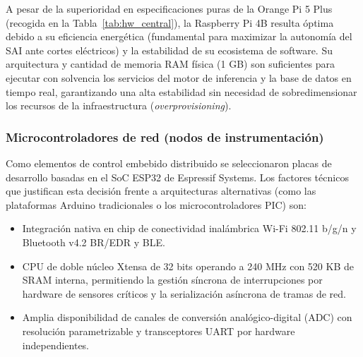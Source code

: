 A pesar de la superioridad en especificaciones puras de la Orange Pi 5 Plus (recogida en la Tabla~\ref{tab:hw_central}), la Raspberry Pi 4B resulta óptima debido a su eficiencia energética (fundamental para maximizar la autonomía del SAI ante cortes eléctricos) y la estabilidad de su ecosistema de software. Su arquitectura y cantidad de memoria RAM física (1 GB) son suficientes para ejecutar con solvencia los servicios del motor de inferencia y la base de datos en tiempo real, garantizando una alta estabilidad sin necesidad de sobredimensionar los recursos de la infraestructura (\textit{overprovisioning}).

\subsubsection{Microcontroladores de red (nodos de instrumentación)}
Como elementos de control embebido distribuido se seleccionaron placas de desarrollo basadas en el SoC ESP32 de Espressif Systems. Los factores técnicos que justifican esta decisión frente a arquitecturas alternativas (como las plataformas Arduino tradicionales o los microcontroladores PIC) son:
\begin{itemize}
    \item Integración nativa en chip de conectividad inalámbrica Wi-Fi 802.11 b/g/n y Bluetooth v4.2 BR/EDR y BLE.
    \item CPU de doble núcleo Xtensa de 32 bits operando a 240 MHz con 520 KB de SRAM interna, permitiendo la gestión síncrona de interrupciones por hardware de sensores críticos y la serialización asíncrona de tramas de red.
    \item Amplia disponibilidad de canales de conversión analógico-digital (ADC) con resolución parametrizable y transceptores UART por hardware independientes.
\end{itemize}

